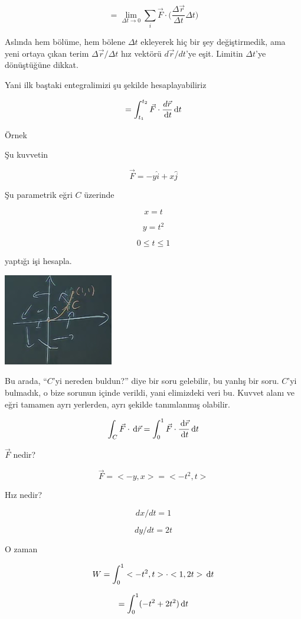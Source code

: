 \documentclass[12pt,fleqn]{article}\usepackage{../../common}
\begin{document}
$$ = 
\lim_{\Delta t \to 0} \sum_i  
\vec{F} \cdot \bigg( \frac{\Delta\vec{r}}{\Delta t} \Delta t 
\bigg)
$$

Aslında hem bölüme, hem bölene $\Delta t$ ekleyerek hiç bir şey
değiştirmedik, ama yeni ortaya çıkan terim $\Delta\vec{r} / \Delta t$ hız
vektörü $d\vec{r}/dt$'ye eşit. Limitin $\Delta t$'ye dönüştüğüne dikkat.

Yani ilk baştaki entegralimizi şu şekilde hesaplayabiliriz

$$ = \int_{t_1}^{t_2} \vec{F} \cdot \frac{d\vec{r}}{\,\mathrm{d} t} \,\mathrm{d} t $$

Örnek

Şu kuvvetin

$$ \vec{F} = -y\hat{i} + x\hat{j} $$

Şu parametrik eğri $C$ üzerinde

$$ x = t  $$

$$ y = t^2 $$

$$ 0 \le t \le 1 $$

yaptığı işi hesapla. 

\begin{center}
\includegraphics[height=4cm]{19_10.png}
\end{center}

Bu arada, ``$C$'yi nereden buldun?'' diye bir soru gelebilir, bu yanlış bir
soru. $C$'yi bulmadık, o bize sorunun içinde verildi, yani elimizdeki veri
bu. Kuvvet alanı ve eğri tamamen ayrı yerlerden, ayrı şekilde tanımlanmış
olabilir. 

$$
\int_C \vec{F} \cdot \,\mathrm{d}\vec{r} 
= \int_{0}^{1} \vec{F} \cdot \frac{\,\mathrm{d}\vec{r}}{\,\mathrm{d} t} \,\mathrm{d} t 
$$

$\vec{F}$ nedir? 

$$ \vec{F} = <-y,x> = <-t^2,t> $$

Hız nedir? 

$$ dx/dt = 1 $$

$$ dy/dt = 2t $$

O zaman 

$$ W = \int_{0}^{1}  <-t^2,t>\cdot<1,2t> \,\mathrm{d} t $$

$$ = \int_{0}^{1} (-t^2 + 2t^2) \,\mathrm{d} t $$
\end{document}
